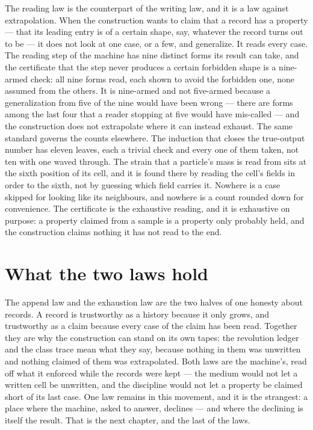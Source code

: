 The reading law is the counterpart of the writing law, and it is a law against extrapolation. When the
construction wants to claim that a record has a property --- that its leading entry is of a certain shape,
say, whatever the record turns out to be --- it does not look at one case, or a few, and generalize. It
reads every case. The reading step of the machine has nine distinct forms its result can take, and the
certificate that the step never produces a certain forbidden shape is a nine-armed check: all nine forms
read, each shown to avoid the forbidden one, none assumed from the others. It is nine-armed and not
five-armed because a generalization from five of the nine would have been wrong --- there are forms among
the last four that a reader stopping at five would have mis-called --- and the construction does not
extrapolate where it can instead exhaust. The same standard governs the counts elsewhere. The induction that
closes the true-output number has eleven leaves, each a trivial check and every one of them taken, not ten
with one waved through. The strain that a particle's mass is read from sits at the sixth position of its
cell, and it is found there by reading the cell's fields in order to the sixth, not by guessing which field
carries it. Nowhere is a case skipped for looking like its neighbours, and nowhere is a count rounded down
for convenience. The certificate is the exhaustive reading, and it is exhaustive on purpose: a property
claimed from a sample is a property only probably held, and the construction claims nothing it has not read
to the end.

\section{What the two laws hold}
\label{se:what-the-two-laws-hold}

The append law and the exhaustion law are the two halves of one honesty about records. A record is
trustworthy as a history because it only grows, and trustworthy as a claim because every case of the claim
has been read. Together they are why the construction can stand on its own tapes: the revolution ledger and
the class trace mean what they say, because nothing in them was unwritten and nothing claimed of them was
extrapolated. Both laws are the machine's, read off what it enforced while the records were kept ---
the medium would not let a written cell be unwritten, and the discipline would not let a property be claimed
short of its last case. One law remains in this movement, and it is the strangest: a place where the machine,
asked to answer, declines --- and where the declining is itself the result. That is the next chapter, and
the last of the laws.
